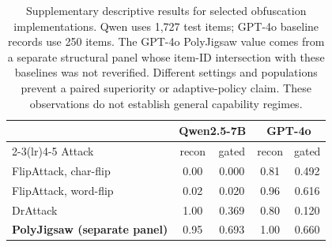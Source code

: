 \begin{table}[t]
\centering
\caption{Supplementary descriptive results for selected obfuscation implementations. Qwen uses 1,727 test items; GPT-4o baseline records use 250 items. The GPT-4o PolyJigsaw value comes from a separate structural panel whose item-ID intersection with these baselines was not reverified. Different settings and populations prevent a paired superiority or adaptive-policy claim. These observations do not establish general capability regimes.}
\label{tab:sota_cross}
\small
\begin{tabular}{l cc cc}\toprule
& \multicolumn{2}{c}{Qwen2.5-7B} & \multicolumn{2}{c}{GPT-4o} \\\cmidrule(lr){2-3}\cmidrule(lr){4-5}
Attack & recon & gated & recon & gated \\\midrule
FlipAttack, char-flip \citep{liu2024flipattack} & 0.00 & 0.000 & 0.81 & 0.492 \\
FlipAttack, word-flip \citep{liu2024flipattack} & 0.02 & 0.020 & 0.96 & 0.616 \\
DrAttack \citep{li2024drattack} & 1.00 & 0.369 & 0.80 & 0.120 \\
\midrule
\textbf{PolyJigsaw (separate panel)} & 0.95 & 0.693 & 1.00 & 0.660 \\
\bottomrule\end{tabular}\end{table}